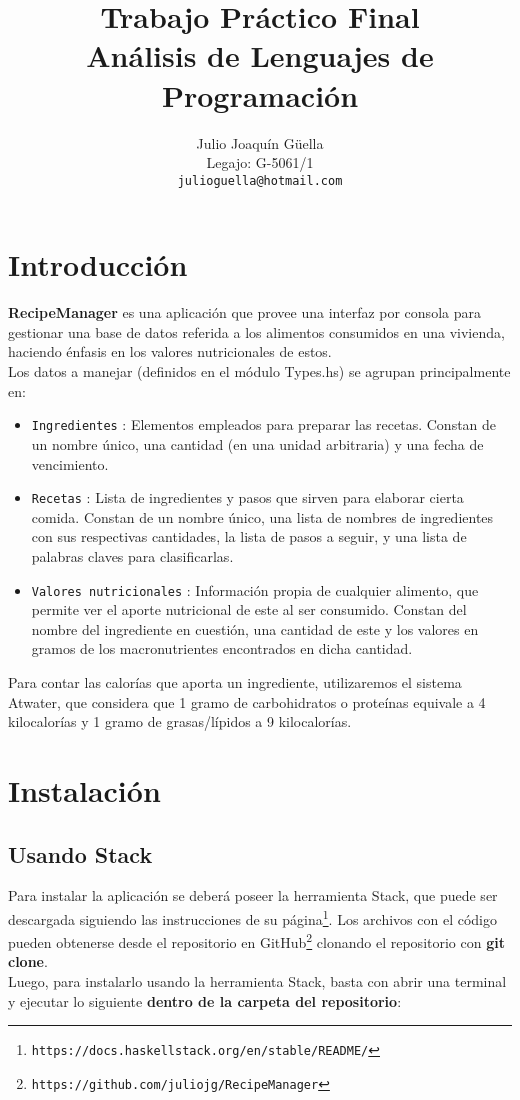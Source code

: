 \documentclass[a4paper]{article}
\title{\huge{Trabajo Práctico Final}\\
    \Large{Análisis de Lenguajes de Programación}}
\author{Julio Joaquín Güella\\
        Legajo: G-5061/1\\
        \texttt{julioguella@hotmail.com}}
\date{}
\begin{document}
\maketitle


\thispagestyle{empty}
\newpage




\section*{Introducción}
\textbf{RecipeManager} es una aplicación que provee una interfaz por consola para gestionar una base de datos referida a los alimentos consumidos en una vivienda, haciendo énfasis en los valores nutricionales de estos. \\
Los datos a manejar (definidos en el módulo Types.hs) se agrupan principalmente en:\\ 
\begin{itemize}
\item \texttt{Ingredientes} : Elementos empleados para preparar las recetas. Constan de un nombre único, una cantidad (en una unidad arbitraria) y una fecha de vencimiento.

\item \texttt{Recetas} : Lista de ingredientes y pasos que sirven para elaborar cierta comida. Constan de un nombre único, una lista de nombres de ingredientes con sus respectivas cantidades, la lista de pasos a seguir, y una lista de palabras claves para clasificarlas.

\item \texttt{Valores nutricionales} : Información propia de cualquier alimento, que permite ver el aporte nutricional de este al ser consumido. Constan del nombre del ingrediente en cuestión, una cantidad de este y los valores en gramos de los macronutrientes encontrados en dicha cantidad. 
\end{itemize}
Para contar las calorías que aporta un ingrediente, utilizaremos el sistema Atwater, que considera que  1 gramo de carbohidratos o proteínas equivale a 4 kilocalorías y 1 gramo de grasas/lípidos a 9 kilocalorías.

\section*{Instalación}

\subsection*{Usando Stack}
Para instalar la aplicación se deberá poseer la herramienta Stack, que puede ser descargada siguiendo las instrucciones de su página\footnote{\texttt{https://docs.haskellstack.org/en/stable/README/}}. 
Los archivos con el código pueden obtenerse desde el repositorio en
GitHub\footnote{\texttt{https://github.com/juliojg/RecipeManager}}
clonando el repositorio con \textbf{git clone}. \\
Luego, para instalarlo usando la herramienta Stack, basta con abrir una terminal y ejecutar lo siguiente \textbf{dentro de la carpeta del 
repositorio}:\\
\end{document}
